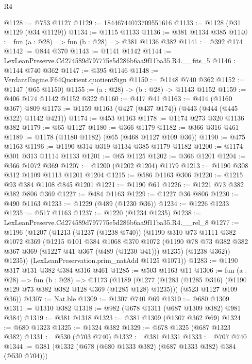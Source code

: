\begin{lexlean}{R4}
\begin{coremodule}
@1128 := @753 @1127
@1129 := 18446744073709551616
@1133 := @1128 (@31 @1129 (@34 @1129))
@1134 := @1115 @1133
@1136 := @381 @1134 @385
@1140 := fun (a : @28) => fun (b : @28) => @381 @1136 @382
@1141 := @392 @174
@1142 := @844 @370
@1143 := @1141 @1142
@1144 := LexLeanPreserve.Cd274589d797775e5d286b6aa9f11ba35.R4.__fits_5
@1146 := @1144 @740 @362
@1147 := @395 @1146
@1148 := VerdantEngine.F64Quotient.quotientSign
@1150 := @1148 @740 @362
@1152 := @1147 (@65 @1150)
@1155 := (a : @28) -> (b : @28) -> @1143 @1152
@1159 := @406 @174 @1142 @1152 @322
@1160 := @417 @41
@1163 := @414 (@1160 @367) @809
@1173 := @1159 @1163 (@427 (@437 @174)) (@443 (@444 (@445 @322) @1142 @421))
@1174 := @453 @1163
@1178 := @1174 @273 @320 @1136 @382
@1179 := @65 @1127
@1180 := @366 @1179
@1182 := @366 @316 @461
@1189 := @1178 (@1180 @1182) (@65 (@468 @1127 @109 @36))
@1190 := @475 @1163
@1196 := @1190 @314 @319 @1134 @385 @1179 @1182
@1200 := @1174 @301 @313 @1114 @1133
@1201 := @65 @1125
@1202 := @366 @1201
@1204 := @366 @1072 @369
@1207 := @1200 (@1202 @1204) @1179
@1213 := @1190 @308 @312 @1109 @1113 @1201 @1204
@1215 := @586 @1163 @306
@1220 := @1215 @93 @384 @1108 @845 @1201
@1221 := @1190 @61
@1226 := @1221 @73 @382 @382 @806 @369
@1227 := @484 @1163
@1229 := @1227 @36 @806
@1230 := @490 @1163
@1233 := @1229 (@489 (@1230 @36))
@1234 := @1226 @1233
@1235 := @517 @1163
@1237 := @1220 (@1234 @1235)
@1238 := LexLeanPreserve.Cd274589d797775e5d286b6aa9f11ba35.R4.__rel_8
@1277 := @1196
    (@1207
      (@1213
        (@1237 (@1238 @740))
        (@1190
          @310
          @73
          @1111
          @382
          @1072
          @369
          (@1215
            @101
            @384
            @1068
            @370
            @1072
            (@1190 @78 @73 @382 @382 @367 @369 (@1227 @41 @367 (@489 (@1230 @41))) @1235)
            (@1238 @362))
          @1235))
      (LexLeanPreservation.prim_natAdd @1125 @1071))
@1283 := @1190 @317 @131 @382 @384 @316 @461
@1285 := @503 @1163 @11
@1306 := fun (a : @28) =>
  fun (b : @28) =>
  @1173
    (@1189
      (@1277 (@1283 (@1285 @316) (@1190 @129 @73 @382 @382 @128 @369 (@1285 @128) @1235)))
      (@523 @1127 @109 @36))
@1307 := Nat.ble
@1309 := @1307 @740 @69
@1310 := @680 @1309
@1311 := @1310 @382
@1318 := @982 (@678 @1311 (@687 @1309 @382) @981 @384)
@1319 := @381 @1318
@1323 := @381 @1309 (@1307 @362 @69)
@1324 := @680 @1323
@1325 := @1324 @382
@1329 := @678 @1325 (@687 @1323 @382)
@1331 := @530 (@703 @740)
@1332 := @381 @1331
@1333 := @707 @740
@1344 := @381 (@1332 (@678 (@680 @1333 @382) (@687 @1333 @382) @384 (@530 @704)))

\end{coremodule}
\end{lexlean}
